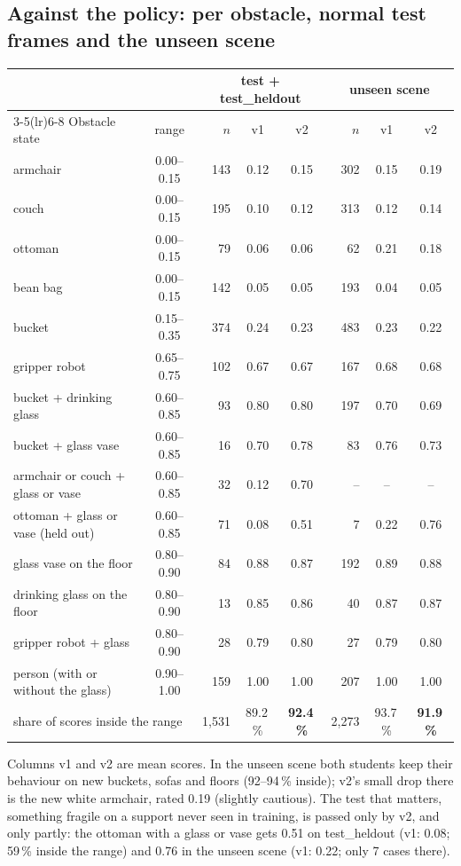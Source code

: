 \documentclass[10pt,a4paper]{article}
\begin{document}
\subsection{Against the policy: per obstacle, normal test frames and the unseen scene}
\begin{center}\small
\begin{tabular}{lcrccrcc}
\toprule
 & & \multicolumn{3}{c}{test + test\_heldout} & \multicolumn{3}{c}{unseen scene} \\
\cmidrule(lr){3-5}\cmidrule(lr){6-8}
Obstacle state & range & $n$ & v1 & v2 & $n$ & v1 & v2 \\
\midrule
armchair & 0.00--0.15 & 143 & 0.12 & 0.15 & 302 & 0.15 & 0.19 \\
couch & 0.00--0.15 & 195 & 0.10 & 0.12 & 313 & 0.12 & 0.14 \\
ottoman & 0.00--0.15 & 79 & 0.06 & 0.06 & 62 & 0.21 & 0.18 \\
bean bag & 0.00--0.15 & 142 & 0.05 & 0.05 & 193 & 0.04 & 0.05 \\
bucket & 0.15--0.35 & 374 & 0.24 & 0.23 & 483 & 0.23 & 0.22 \\
gripper robot & 0.65--0.75 & 102 & 0.67 & 0.67 & 167 & 0.68 & 0.68 \\
bucket + drinking glass & 0.60--0.85 & 93 & 0.80 & 0.80 & 197 & 0.70 & 0.69 \\
bucket + glass vase & 0.60--0.85 & 16 & 0.70 & 0.78 & 83 & 0.76 & 0.73 \\
armchair or couch + glass or vase & 0.60--0.85 & 32 & 0.12 & 0.70 & -- & -- & -- \\
ottoman + glass or vase (held out) & 0.60--0.85 & 71 & 0.08 & 0.51 & 7 & 0.22 & 0.76 \\
glass vase on the floor & 0.80--0.90 & 84 & 0.88 & 0.87 & 192 & 0.89 & 0.88 \\
drinking glass on the floor & 0.80--0.90 & 13 & 0.85 & 0.86 & 40 & 0.87 & 0.87 \\
gripper robot + glass & 0.80--0.90 & 28 & 0.79 & 0.80 & 27 & 0.79 & 0.80 \\
person (with or without the glass) & 0.90--1.00 & 159 & 1.00 & 1.00 & 207 & 1.00 & 1.00 \\
\midrule
\multicolumn{2}{l}{share of scores inside the range} & 1{,}531 & 89.2\,\% & \textbf{92.4\,\%} & 2{,}273 & 93.7\,\% & \textbf{91.9\,\%} \\
\bottomrule
\end{tabular}
\end{center}
Columns v1 and v2 are mean scores. In the unseen scene both students keep their behaviour on new buckets, sofas and floors
(92--94\,\% inside); v2's small drop there is the new white armchair, rated 0.19 (slightly cautious). The test that matters,
something fragile on a support never seen in training, is passed only by v2, and only partly: the ottoman with a glass or vase
gets 0.51 on test\_heldout (v1: 0.08; 59\,\% inside the range) and 0.76 in the unseen scene (v1: 0.22; only 7 cases there).
\end{document}
